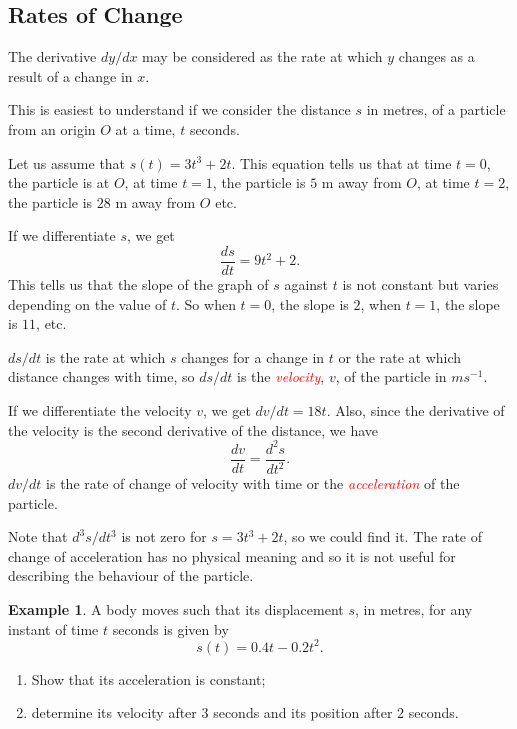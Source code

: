 \documentclass[
  11pt,
  oneside]{book}
\providecommand{\tightlist}{%
  \setlength{\itemsep}{0pt}\setlength{\parskip}{0pt}}
\newcommand{\slide}{}
\theoremstyle{definition}
\theoremstyle{definition}
\newtheorem{example}{Example}[chapter]
\theoremstyle{definition}
\theoremstyle{definition}
\theoremstyle{remark}
\begin{document}
\slide

\subsection{Rates of Change}\label{rates-of-change}

The derivative \(dy/dx\) may be considered as the rate at which \(y\) changes as a result of a change in \(x\).

This is easiest to understand if we consider the distance \(s\) in metres, of a particle from an origin \(O\) at a time, \(t\) seconds.

Let us assume that \(s(t) = 3t^3 + 2t\). This equation tells us that at time \(t = 0\), the particle is at \(O\), at time \(t = 1\), the particle is \(5\) m away from \(O\), at time \(t = 2\), the particle is \(28\) m away from \(O\) etc.

If we differentiate \(s\), we get
\[
\frac{ds}{dt} = 9t^2 + 2.
\]
This tells us that the slope of the graph of \(s\) against \(t\) is not constant but varies depending on the value of \(t\). So when \(t = 0\), the slope is \(2\), when \(t = 1\), the slope is \(11\), etc.
\slide

\(ds/dt\) is the rate at which \(s\) changes for a change in \(t\) or the rate at which distance changes with time, so \(ds/dt\) is the \textcolor{red}{\em velocity}, \(v\), of the particle in \(ms^{-1}\).

If we differentiate the velocity \(v\), we get \(dv/dt = 18t\). Also, since the derivative of the velocity is the second derivative of the distance, we have
\[
\frac{dv}{dt}= \frac{d^2s}{dt^2}.
\]
\(dv/dt\) is the rate of change of velocity with time or the \textcolor{red}{\em acceleration} of the particle.

Note that \(d^3s/dt^3\) is not zero for \(s = 3t^3 + 2t\), so we could find it. The rate of change of acceleration has no physical meaning and so it is not useful for describing the behaviour of the particle.
\slide

\begin{example}

A body moves such that its displacement \(s\), in metres, for any instant of time \(t\) seconds is given by
\[
s(t) = 0.4t-0.2t^2.
\]

\begin{enumerate}
\def\labelenumi{\arabic{enumi}.}
\tightlist
\item
  Show that its acceleration is constant;
\item
  determine its velocity after \(3\) seconds and its position after \(2\) seconds.
\end{enumerate}

\end{example}
\end{document}
